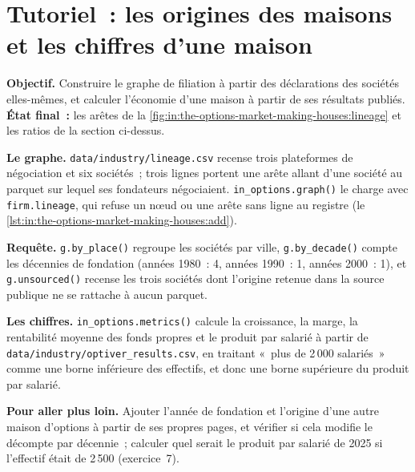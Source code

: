 \section{Tutoriel~: les origines des maisons et les chiffres d'une maison}\label{tut:in:the-options-market-making-houses:tut}

\begin{tutorial}
\textbf{Objectif.} Construire le graphe de filiation à partir des déclarations des sociétés elles-mêmes, et calculer l'économie d'une maison à partir de ses
résultats publiés. \textbf{État final~:} les arêtes de la \cref{fig:in:the-options-market-making-houses:lineage} et les ratios de
la section ci-dessus.
\begin{tutsteps}
\item \textbf{Le graphe.} \texttt{data/industry/lineage.csv} recense trois plateformes de négociation et six sociétés~; trois lignes portent une arête
allant d'une société au parquet sur lequel ses fondateurs négociaient. \texttt{in\_options.graph()} le charge avec \texttt{firm.lineage},
qui refuse un nœud ou une arête sans ligne au registre
(le \cref{lst:in:the-options-market-making-houses:add}).
\label{lst:in:the-options-market-making-houses:add}
\item \textbf{Requête.} \texttt{g.by\_place()} regroupe les sociétés par ville, \texttt{g.by\_decade()} compte les décennies de fondation
(années 1980~: 4, années 1990~: 1, années 2000~: 1), et \texttt{g.unsourced()} recense les trois sociétés dont l'origine retenue dans la source publique
ne se rattache à aucun parquet.
\item \textbf{Les chiffres.} \texttt{in\_options.metrics()} calcule la croissance, la marge, la rentabilité moyenne des fonds propres et le produit
par salarié à partir de \texttt{data/industry/optiver\_results.csv}, en traitant «~plus de 2\,000 salariés~» comme une borne inférieure des
effectifs, et donc une borne supérieure du produit par salarié.
\end{tutsteps}
\end{tutorial}

\textbf{Pour aller plus loin.} Ajouter l'année de fondation et l'origine d'une autre maison d'options à partir de ses propres pages, et vérifier
si cela modifie le décompte par décennie~; calculer quel serait le produit par salarié de 2025 si l'effectif était de 2\,500
(exercice~7).

